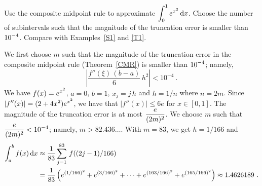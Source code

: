 \begin{egg}
Use the composite midpoint rule to approximate
$\displaystyle \int_0^1 e^{x^2}\,\mathrm{d}x$.
Choose the number of subintervals such that the magnitude of the
truncation error is smaller than $\displaystyle 10^{-4}$.  Compare with
Examples~\ref{S1} and \ref{T1}.

We first choose $m$ such that the magnitude of the truncation error in
the composite midpoint rule (Theorem~\ref{CMR}) is smaller than
$\displaystyle 10^{-4}$; namely,
\[
\left| \frac{f''(\xi)\,(b-a)}{6}\,h^2 \right| < 10^{-4}  \ .
\]
We have $\displaystyle f(x)=e^{x^2}$, $a=0$, $b=1$, $x_j = j\,h$ and
$h = 1/n$ where $n=2m$.  Since
$\displaystyle |f''(x)|=(2+4x^2)e^{x^2}$, we have that
$|f''(x)|\leq 6e$ for $x \in [0,1]$.  The magnitude of the
truncation error is at most $\displaystyle \frac{e}{(2m)^2}$.  We
choose $m$ such that $\displaystyle \frac{e}{(2m)^2} < 10^{-4}$;
namely, $m > 82.436\ldots$.  With $m=83$, we get $h=1/166$
and
\begin{align*}
\int_{a}^{b} f(x)\,\mathrm{d}x
&\approx \frac{1}{83} \sum_{j=1}^{83}\,f((2j-1)/166) \\
&= \frac{1}{83} \left( e^{(1/166)^2} + e^{(3/166)^2} + \dots
+e^{(163/166)^2}+e^{(165/166)^2} \right)
\approx 1.4626189 \ .
\end{align*}
\end{egg}

